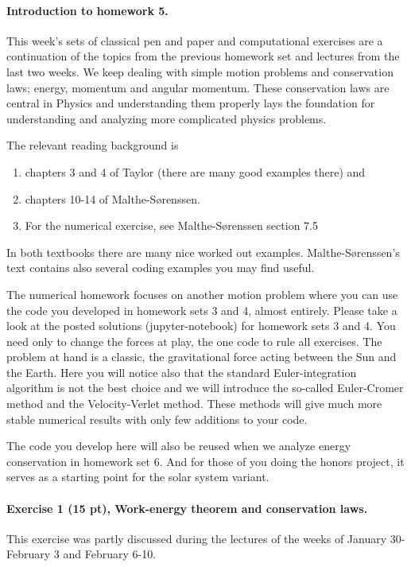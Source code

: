 \documentclass[%
oneside,                 %
final,                   %
10pt]{article}
\begin{document}
\noindent
\paragraph{Introduction to homework 5.}
This week's sets of classical pen and paper and computational
exercises are a continuation of the topics from the previous homework
set and lectures from the last two weeks. We keep dealing with simple
motion problems and conservation laws; energy, momentum and angular
momentum. These conservation laws are central in Physics and
understanding them properly lays the foundation for understanding and
analyzing more complicated physics problems.

The relevant reading background is
\begin{enumerate}
\item chapters 3 and 4 of Taylor (there are many good examples there) and

\item chapters 10-14 of Malthe-Sørenssen.

\item For the numerical exercise, see Malthe-Sørenssen section 7.5
\end{enumerate}

\noindent
In both textbooks there are many nice worked out examples. Malthe-Sørenssen's text contains also several coding examples you may find useful. 

The numerical homework focuses on another motion problem where you can
use the code you developed in homework sets 3 and 4, almost entirely. Please take
a look at the posted solutions (jupyter-notebook) for homework sets 3 and 4. You
need only to change the forces at play, the one code to rule all exercises. The problem at hand is a
classic, the gravitational force acting between the Sun and the
Earth. Here you will notice also that the standard Euler-integration
algorithm is not the best choice and we will introduce the so-called
Euler-Cromer method and the Velocity-Verlet method. These methods will
give much more stable numerical results with only few additions to
your code.

The code you develop here will also be reused when we analyze energy
conservation in homework set 6. And for those of you doing the honors
project, it serves as a starting point for the solar system variant.

\paragraph{Exercise 1 (15 pt), Work-energy theorem and conservation laws.}
This exercise was partly discussed during the lectures of the weeks of January 30-February 3 and February 6-10.
\end{document}
